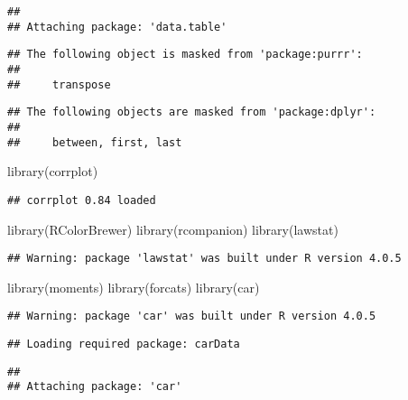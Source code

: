 \documentclass[
]{article}
\newenvironment{Shaded}{\begin{snugshade}}{\end{snugshade}}
\newcommand{\FunctionTok}[1]{\textcolor[rgb]{0.00,0.00,0.00}{#1}}
\newcommand{\NormalTok}[1]{#1}
\begin{document}
\begin{verbatim}
## 
## Attaching package: 'data.table'
\end{verbatim}

\begin{verbatim}
## The following object is masked from 'package:purrr':
## 
##     transpose
\end{verbatim}

\begin{verbatim}
## The following objects are masked from 'package:dplyr':
## 
##     between, first, last
\end{verbatim}

\begin{Shaded}
\begin{Highlighting}[]
\FunctionTok{library}\NormalTok{(corrplot)}
\end{Highlighting}
\end{Shaded}

\begin{verbatim}
## corrplot 0.84 loaded
\end{verbatim}

\begin{Shaded}
\begin{Highlighting}[]
\FunctionTok{library}\NormalTok{(RColorBrewer)}
\FunctionTok{library}\NormalTok{(rcompanion)}
\FunctionTok{library}\NormalTok{(lawstat)}
\end{Highlighting}
\end{Shaded}

\begin{verbatim}
## Warning: package 'lawstat' was built under R version 4.0.5
\end{verbatim}

\begin{Shaded}
\begin{Highlighting}[]
\FunctionTok{library}\NormalTok{(moments)}
\FunctionTok{library}\NormalTok{(forcats)}
\FunctionTok{library}\NormalTok{(car)}
\end{Highlighting}
\end{Shaded}

\begin{verbatim}
## Warning: package 'car' was built under R version 4.0.5
\end{verbatim}

\begin{verbatim}
## Loading required package: carData
\end{verbatim}

\begin{verbatim}
## 
## Attaching package: 'car'
\end{verbatim}
\end{document}
